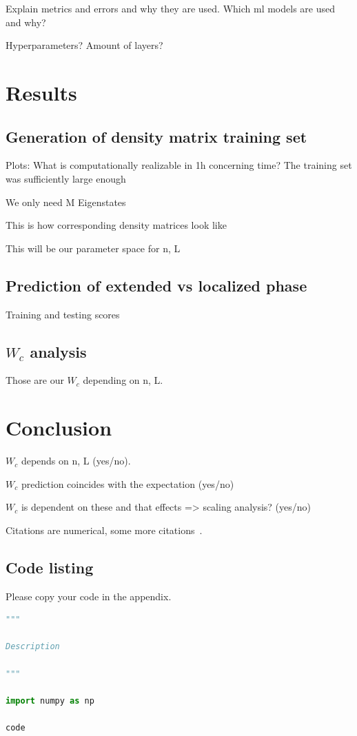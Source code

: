 \documentclass[reprint,amsmath,amssymb,aps,prb]{revtex4-2}
\begin{document}
Explain metrics and errors and why they are used. Which ml models are used and why?

Hyperparameters? Amount of layers?

\section{Results}%

\subsection{Generation of density matrix training set}

Plots: 
What is computationally realizable in 1h concerning time?
The training set was sufficiently large enough 

We only need M Eigenstates

This is how corresponding density matrices look like

This will be our parameter space for n, L

\subsection{Prediction of extended vs localized phase}

Training and testing scores

\subsection{$W_c$ analysis}

Those are our $W_c$ depending on n, L.

\section{Conclusion}%

$W_c$ depends on n, L (yes/no).

$W_c$ prediction coincides with the expectation (yes/no)

$W_c$ is dependent on these and that effects => scaling analysis? (yes/no)

Citations are numerical\cite{epr}, some more citations~\cite{feyn54,Bire82,Berman1983,witten2001,Davies1998}. 




\appendix


\begin{widetext}
\section{Code listing} \label{app:codes}
Please copy your code in the appendix.
\begin{lstlisting}[language=Python]
"""

Description

"""

import numpy as np

code
\end{lstlisting}
\end{widetext}
\end{document}
